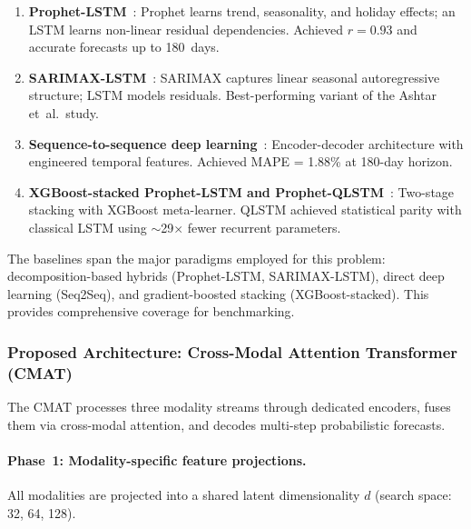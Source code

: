 \begin{enumerate}
    \item \textbf{Prophet-LSTM}~\cite{van_de_sande_enhancing_2024}: Prophet learns trend, seasonality, and holiday effects; an LSTM learns non-linear residual dependencies. Achieved $r = 0.93$ and accurate forecasts up to 180~days.
    \item \textbf{SARIMAX-LSTM}~\cite{ashtar_hybrid_2025}: SARIMAX captures linear seasonal autoregressive structure; LSTM models residuals. Best-performing variant of the Ashtar et~al.\ study.
    \item \textbf{Sequence-to-sequence deep learning}~\cite{ashtar_hybrid_2025}: Encoder-decoder architecture with engineered temporal features. Achieved MAPE = 1.88\% at 180-day horizon.
    \item \textbf{XGBoost-stacked Prophet-LSTM and Prophet-QLSTM}~\cite{curiel_integrating_2025}: Two-stage stacking with XGBoost meta-learner. QLSTM achieved statistical parity with classical LSTM using $\sim$29$\times$ fewer recurrent parameters.
\end{enumerate}

The baselines span the major paradigms employed for this problem: decomposition-based hybrids (Prophet-LSTM, SARIMAX-LSTM), direct deep learning (Seq2Seq), and gradient-boosted stacking (XGBoost-stacked). This provides comprehensive coverage for benchmarking.

\subsubsection{Proposed Architecture: Cross-Modal Attention Transformer (CMAT)}
\label{subsubsec:cmat}

The CMAT processes three modality streams through dedicated encoders, fuses them via cross-modal attention, and decodes multi-step probabilistic forecasts.

\paragraph{Phase~1: Modality-specific feature projections.}
All modalities are projected into a shared latent dimensionality $d$ (search space: 32, 64, 128).

